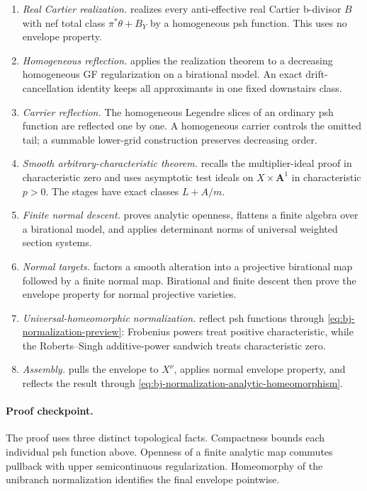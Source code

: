 \begin{enumerate}
\item \emph{Real Cartier realization.}
 realizes every anti-effective real Cartier
b-divisor $B$ with
nef total class $\pi^*\theta+B_Y$ by a homogeneous psh function.  This
uses no envelope property.
\item \emph{Homogeneous reflection.}
 applies the realization theorem to a decreasing homogeneous GF
regularization on a birational model.  An exact drift-cancellation identity
keeps all approximants in one fixed downstairs class.
\item \emph{Carrier reflection.}
The homogeneous Legendre slices of an ordinary psh function are reflected
one by one.  A homogeneous carrier controls the omitted tail; a summable
lower-grid construction preserves decreasing order.
\item \emph{Smooth arbitrary-characteristic theorem.}
 recalls the multiplier-ideal proof in characteristic zero and
uses asymptotic test ideals on $X\times\mathbf A^1$ in characteristic
$p>0$.  The stages have exact classes $L+A/m$.
\item \emph{Finite normal descent.}
 proves analytic openness, flattens a finite algebra over a
birational model, and applies determinant norms of universal weighted
section systems.
\item \emph{Normal targets.}
 factors a smooth alteration into a projective birational map
followed by a finite normal map.  Birational and finite descent then prove
the envelope property for normal projective varieties.
\item \emph{Universal-homeomorphic normalization.}
reflect psh functions through
\eqref{eq:bj-normalization-preview}: Frobenius powers treat positive
characteristic, while the Roberts--Singh additive-power sandwich treats
characteristic zero.
\item \emph{Assembly.}
 pulls the envelope to $X^\nu$, applies normal envelope property,
and reflects the result through
\eqref{eq:bj-normalization-analytic-homeomorphism}.
\end{enumerate}

\paragraph{Proof checkpoint.}
The proof uses three distinct topological facts.  Compactness bounds each
individual psh function above.  Openness of a finite analytic map commutes
pullback with upper semicontinuous regularization.  Homeomorphy of the
unibranch normalization identifies the final envelope pointwise.

